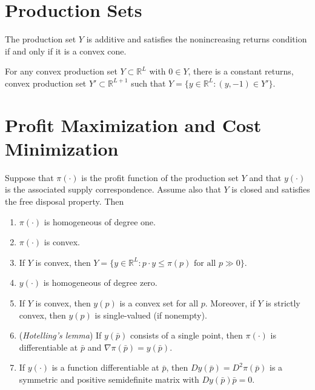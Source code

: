 \addtocounter{section}{1}

\section{Production Sets}

\begin{prop}
    The production set $Y$ is additive and satisfies the nonincreasing returns condition if and only if it is a convex cone.
\end{prop}

\begin{prop}
    For any convex production set $Y \subset \mathbb{R}^L$ with $0 \in Y$, there is a constant returns, convex production set $Y' \subset \mathbb{R}^{L + 1}$ such that $Y = \{y \in \mathbb{R}^L: (y, -1) \in Y'\}$.
\end{prop}


\section{Profit Maximization and Cost Minimization}

\begin{prop}
    Suppose that $\pi(\cdot)$ is the profit function of the production set $Y$ and that $y(\cdot)$ is the associated supply correspondence. Assume also that $Y$ is closed and satisfies the free disposal property. Then
    \begin{enumerate}
        \item $\pi(\cdot)$ is homogeneous of degree one.
        \item $\pi(\cdot)$ is convex.
        \item If $Y$ is convex, then $Y = \{y \in \mathbb{R}^L: p \cdot y \leq \pi(p) \text{ for all } p \gg 0\}$.
        \item $y(\cdot)$ is homogeneous of degree zero.
        \item If $Y$ is convex, then $y(p)$ is a convex set for all $p$. Moreover, if $Y$ is strictly convex, then $y(p)$ is single-valued (if nonempty).
        \item (\emph{Hotelling's lemma}) If $y(\bar{p})$ consists of a single point, then $\pi(\cdot)$ is differentiable at $\bar{p}$ and $\nabla \pi(\bar{p}) = y(\bar{p})$.
        \item If $y(\cdot)$ is a function differentiable at $\bar{p}$, then $Dy(\bar{p}) = D^2 \pi(\bar{p})$ is a symmetric and positive semidefinite matrix with $Dy(\bar{p})\bar{p} = 0$.
    \end{enumerate}
\end{prop}

